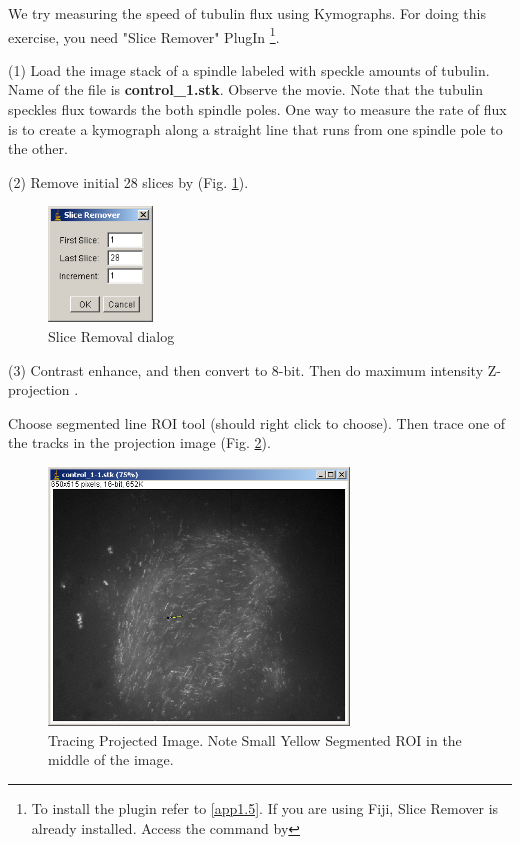 \begin{indentexercise}{1}

We try measuring the speed of tubulin flux using Kymographs. 
For doing this exercise, you need "Slice Remover" PlugIn 
\footnote{ To install the plugin refer to \ref{app1.5}. If you are using Fiji,
Slice Remover is already installed. Access the command by }.

(1) Load the image stack of a spindle labeled with speckle amounts of tubulin. Name of the file is \textbf{control\_1.stk}. Observe the movie. Note that the tubulin speckles flux towards the both spindle
poles. One way to measure the rate of flux is to create a kymograph along a straight line that runs from one spindle pole to the other.

(2) Remove initial 28 slices by  (Fig. \ref{fig:img132}).

\begin{figure}[H]
\begin{center}
\includegraphics[width=2.778cm,height=3.069cm]{img/CMCIBasicCourse201102-img132.png}
\caption{ Slice Removal dialog}
\label{fig:img132}
\end{center}
\end{figure}


(3) Contrast enhance, and then convert to 8-bit. Then do maximum intensity Z-projection . 

Choose segmented line ROI tool (should right click to choose). Then trace one of the tracks in the projection image (Fig. \ref{fig:img133}).

\begin{figure}[htbp]
\begin{center}
\includegraphics[width=8cm]{img/CMCIBasicCourse201102-img133.png}
\caption{ Tracing Projected Image. Note Small Yellow Segmented ROI in the middle of the image.}
\label{fig:img133}
\end{center}
\end{figure}


\end{indentexercise}
